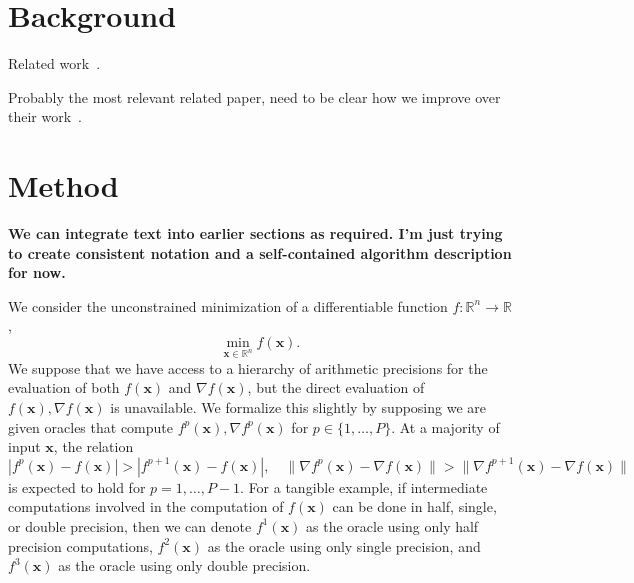 \documentclass{article}
\newcommand{\xb}{\mathbf{x}}
\newcommand{\R}{\mathbb{R}}
\begin{document}
\section{Background}
\label{sec:related}
Related work~\cite{strzodka2006mixed}.

Probably the most relevant related paper, need to be clear how we improve over their work~\cite{gratton2018note}.

\section{Method}
\label{sec:method}

\textbf{We can integrate text into earlier sections as required. I'm just trying to create consistent notation and a self-contained algorithm description for now.}

We consider the unconstrained minimization of a differentiable function $f:\R^n\to\R$,
\begin{equation}
\label{eq:unc}
 \displaystyle\min_{\xb\in\R^n} f(\xb).
\end{equation}
We suppose that we have access to a hierarchy of arithmetic precisions for the evaluation of both $f(\xb)$ and $\nabla f(\xb)$,
but the direct evaluation of $f(\xb),\nabla f(\xb)$ is unavailable. 
We formalize this slightly by supposing we are given oracles that compute $f^p(\xb), \nabla f^p(\xb)$ for $p\in\{1,\dots,P\}$. 
At a majority of input $\xb$, the relation
\begin{equation*}
 |f^p(\xb)-f(\xb)| > |f^{p+1}(\xb)-f(\xb)|, \quad \|\nabla f^p(\xb) - \nabla f(\xb)\| > \|\nabla f^{p+1}(\xb)-\nabla f(\xb)\|
\end{equation*}
 is expected to hold for $p=1,\dots,P-1$.
 For a tangible example, if intermediate computations involved in the computation of $f(\xb)$ can be done in half, single, or double precision,
 then we can denote $f^1(\xb)$ as the oracle using only half precision computations, $f^2(\xb)$ as the oracle using only single precision,
 and $f^3(\xb)$ as the oracle using only double precision. 
\end{document}
